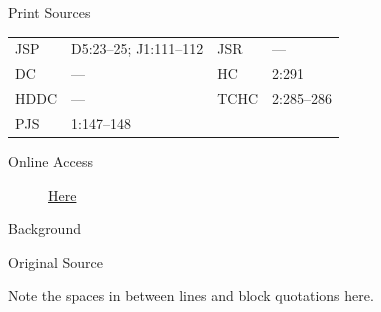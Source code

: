 			\begin{description}
				\item[Print Sources]
			\end{description}

				\begin{tabular}{p{0.5in}p{1in}p{0.5in}p{1in}}
				JSP	 	& D5:23--25; J1:111--112	& JSR 		& --- \\
				DC	 	& --- 			& HC 		& 2:291 \\
				HDDC 	& ---			& TCHC 		& 2:285--286 \\
				PJS 	& 1:147--148			& 	 		&  \\
				\end{tabular}
			
			\begin{description}
				\item[Online Access] \href{https://www.josephsmithpapers.org/paper-summary/prayer-23-october-1835/1}{Here}
			\end{description}
			
			\begin{description}
				\item[Background]
			\end{description}
			
			
			\begin{description}
				\item[Original Source]
			\end{description}
			
				
				Note the spaces in between lines and block quotations here.
			
